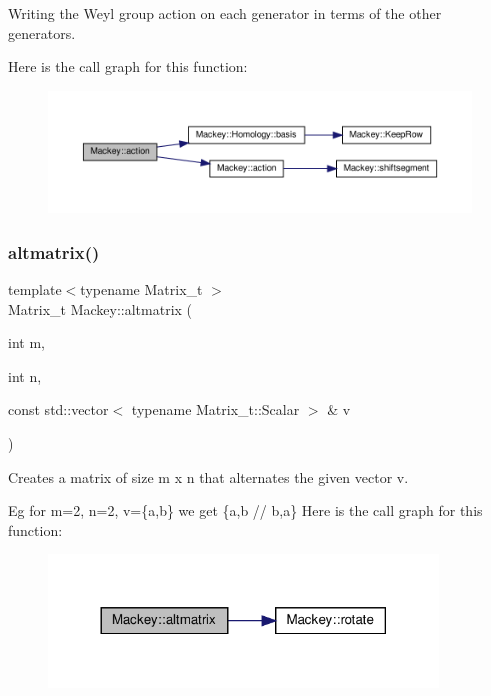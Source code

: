 Writing the Weyl group action on each generator in terms of the other generators. 

Here is the call graph for this function\+:\nopagebreak
\begin{figure}[H]
\begin{center}
\leavevmode
\includegraphics[width=350pt]{namespaceMackey_a9a4f2ced77550a7c06d2c15b39030ff6_cgraph}
\end{center}
\end{figure}
\mbox{\label{namespaceMackey_a26a529f63caac9c5b4dc809e0e5831be}} 
\subsubsection{\texorpdfstring{altmatrix()}{altmatrix()}}
{\footnotesize\ttfamily template$<$typename Matrix\+\_\+t $>$ \\
Matrix\+\_\+t Mackey\+::altmatrix (\begin{DoxyParamCaption}\item[{int}]{m,  }\item[{int}]{n,  }\item[{const std\+::vector$<$ typename Matrix\+\_\+t\+::\+Scalar $>$ \&}]{v }\end{DoxyParamCaption})}



Creates a matrix of size m x n that alternates the given vector v. 

Eg for m=2, n=2, v=\{a,b\} we get \{a,b // b,a\} Here is the call graph for this function\+:\nopagebreak
\begin{figure}[H]
\begin{center}
\leavevmode
\includegraphics[width=293pt]{namespaceMackey_a26a529f63caac9c5b4dc809e0e5831be_cgraph}
\end{center}
\end{figure}
\mbox{\label{namespaceMackey_a86cc6cbaa708580f4e382b066bd0b7d4}} 
